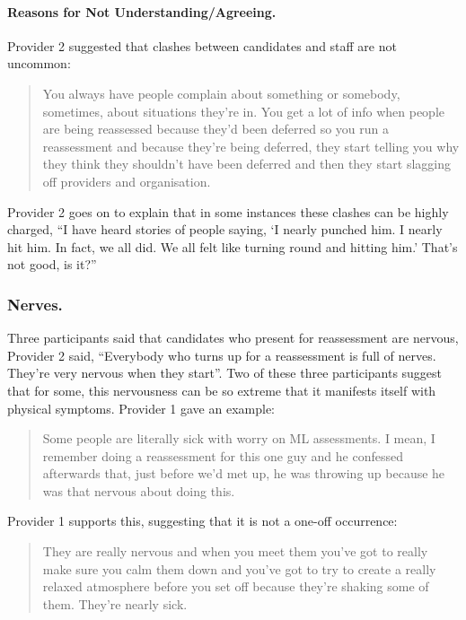 \documentclass[
  12pt,
  a4paper,
]{book}
\begin{document}
\hypertarget{reasons-for-not-understandingagreeing.}{%
\paragraph{Reasons for Not Understanding/Agreeing.}\label{reasons-for-not-understandingagreeing.}}

Provider 2 suggested that clashes between candidates and staff are not uncommon:

\begin{quote}
You always have people complain about something or somebody, sometimes, about situations they're in. You get a lot of info when people are being reassessed because they'd been deferred so you run a reassessment and because they're being deferred, they start telling you why they think they shouldn't have been deferred and then they start slagging off providers and organisation.
\end{quote}

Provider 2 goes on to explain that in some instances these clashes can be highly charged, ``I have heard stories of people saying, `I nearly punched him. I nearly hit him. In fact, we all did. We all felt like turning round and hitting him.' That's not good, is it?''

\hypertarget{nerves.}{%
\subsubsection{Nerves.}\label{nerves.}}

Three participants said that candidates who present for reassessment are nervous, Provider 2 said, ``Everybody who turns up for a reassessment is full of nerves. They're very nervous when they start''. Two of these three participants suggest that for some, this nervousness can be so extreme that it manifests itself with physical symptoms. Provider 1 gave an example:

\begin{quote}
Some people are literally sick with worry on ML assessments. I mean, I remember doing a reassessment for this one guy and he confessed afterwards that, just before we'd met up, he was throwing up because he was that nervous about doing this.
\end{quote}

Provider 1 supports this, suggesting that it is not a one-off occurrence:

\begin{quote}
They are really nervous and when you meet them you've got to really make sure you calm them down and you've got to try to create a really relaxed atmosphere before you set off because they're shaking some of them. They're nearly sick.
\end{quote}
\end{document}
